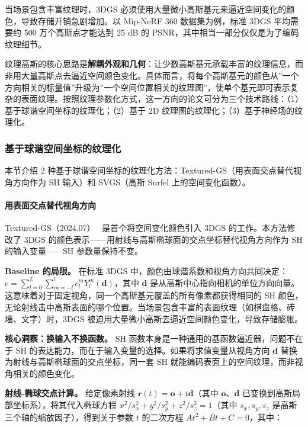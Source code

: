 当场景包含丰富纹理时，3DGS 必须使用大量微小高斯基元来逼近空间变化的颜色，导致存储开销急剧增加。以 Mip-NeRF 360 数据集为例，标准 3DGS 平均需要约 500 万个高斯点才能达到 25 dB 的 PSNR，其中相当一部分仅仅是为了编码纹理细节。

纹理高斯的核心思路是\textbf{解耦外观和几何}：让少数高斯基元承载丰富的纹理信息，而非用大量高斯点去逼近空间颜色变化。具体而言，将每个高斯基元的颜色从”一个方向相关的标量值”升级为”一个空间位置相关的纹理图”，使单个基元即可表示复杂的表面纹理。按照纹理参数化方式，这一方向的论文可分为三个技术路线：（1）基于球谐空间坐标的纹理化；（2）基于 2D 纹理图的纹理化；（3）基于神经场的纹理化。

\subsubsection{基于球谐空间坐标的纹理化}

本节介绍 2 种基于球谐空间坐标的纹理化方法：Textured-GS（用表面交点替代视角方向作为 SH 输入）和 SVGS（高斯 Surfel 上的空间变化函数）。

\paragraph{用表面交点替代视角方向}

Textured-GS（2024.07）~\cite{2407_09733} 是首个将空间变化颜色引入 3DGS 的工作。本方法修改了 3DGS 的颜色表示——用射线与高斯椭球面的交点坐标替代视角方向作为 SH 的输入变量——SH 参数量保持不变。

\textbf{Baseline 的局限。} 在标准 3DGS 中，颜色由球谐系数和视角方向共同决定：$c = \sum_{l=0}^{L} \sum_{m=-l}^{l} c_l^m Y_l^m(\mathbf{d})$，其中 $\mathbf{d}$ 是从高斯中心指向相机的单位方向向量。这意味着对于固定视角，同一个高斯基元覆盖的所有像素都获得相同的 SH 颜色，无论射线击中高斯表面的哪个位置。当场景包含丰富的表面纹理（如棋盘格、砖墙、文字）时，3DGS 被迫用大量微小高斯去逼近空间颜色变化，导致存储膨胀。

\textbf{核心洞察：换输入不换函数。} SH 函数本身是一种通用的基函数逼近器，问题不在于 SH 的表达能力，而在于输入变量的选择。如果将求值变量从视角方向 $\mathbf{d}$ 替换为射线与高斯椭球面的交点坐标，同一套 SH 就能编码表面上的空间纹理，而非视角相关的颜色变化。

\textbf{射线-椭球交点计算。} 给定像素射线 $\mathbf{r}(t) = \mathbf{o} + t\mathbf{d}$（其中 $\mathbf{o}$、$\mathbf{d}$ 已变换到高斯局部坐标系），将其代入椭球方程 $x^2/s_x^2 + y^2/s_y^2 + z^2/s_z^2 = 1$（其中 $s_x, s_y, s_z$ 是高斯三个轴的缩放因子），得到关于参数 $t$ 的二次方程 $At^2 + Bt + C = 0$，其中：

